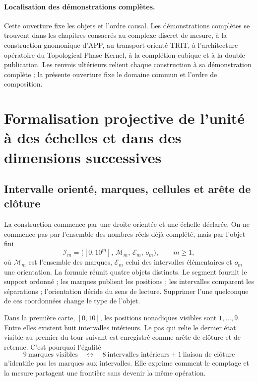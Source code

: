 \paragraph{Localisation des démonstrations complètes.}
Cette ouverture fixe les objets et l'ordre causal. Les démonstrations complètes se
trouvent dans les chapitres consacrés au complexe discret de mesure, à la
construction gnomonique d'APP, au transport orienté TRIT, à l'architecture
opératoire du Topological Phase Kernel, à la complétion cubique et à la double
publication. Les renvois ultérieurs relient chaque construction à sa
démonstration complète ; la présente ouverture fixe le domaine commun et l'ordre
de composition.


\section{Formalisation projective de l'unité à des échelles et dans des dimensions successives}
\label{p12-83-c0-s2:chap:ampliacion-conservacion-unidad}

\subsection{Intervalle orienté, marques, cellules et arête de clôture}

La construction commence par une droite orientée et une échelle déclarée. On ne
commence pas par l'ensemble des nombres réels déjà complété, mais par
l'objet fini
\begin{equation}\label{p12-83-c0-s2:eq:amp-recta-k}
 \mathcal I_m=\bigl([0,10^m],\,\mathcal M_m,\,\mathcal E_m,\,o_m\bigr),
 \qquad m\geq1,
\end{equation}
où \(\mathcal M_m\) est l'ensemble des marques, \(\mathcal E_m\) celui des
intervalles élémentaires et \(o_m\) une orientation. La formule réunit quatre
objets distincts. Le segment fournit le support ordonné ; les marques
publient les positions ; les intervalles comparent les séparations ; l'orientation
décide du sens de lecture. Supprimer l'une quelconque de ces coordonnées
change le type de l'objet.

Dans la première carte, \([0,10]\), les positions nonadiques visibles sont
\(1,\ldots,9\). Entre elles existent huit intervalles intérieurs. Le pas qui
relie le dernier état visible au premier du tour suivant est
enregistré comme arête de clôture et de retenue. C'est pourquoi l'égalité
\begin{equation}\label{p12-83-c0-s2:eq:amp-nueve-marcas-ocho-intervalos}
 9\ \text{marques visibles}
 \quad\longleftrightarrow\quad
 8\ \text{intervalles intérieurs}+1\ \text{liaison de clôture}
\end{equation}
n'identifie pas les marques aux intervalles. Elle exprime comment le comptage et la mesure
partagent une frontière sans devenir la même opération.

